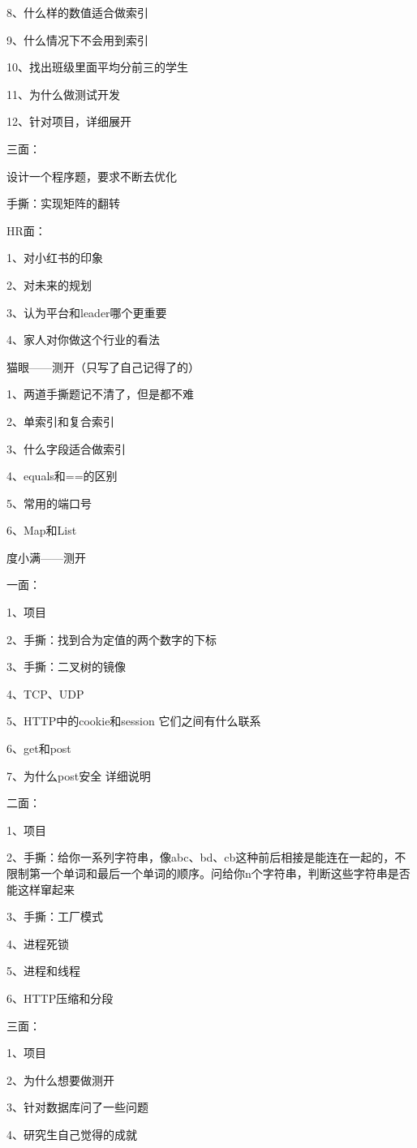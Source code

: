 \documentclass[UTF8]{ctexart}
\begin{document}
8、什么样的数值适合做索引

9、什么情况下不会用到索引

10、找出班级里面平均分前三的学生

11、为什么做测试开发

12、针对项目，详细展开

三面：

设计一个程序题，要求不断去优化

手撕：实现矩阵的翻转

HR面：

1、对小红书的印象

2、对未来的规划

3、认为平台和leader哪个更重要

4、家人对你做这个行业的看法

猫眼——测开（只写了自己记得了的）

1、两道手撕题记不清了，但是都不难

2、单索引和复合索引

3、什么字段适合做索引

4、equals和==的区别

5、常用的端口号

6、Map和List

度小满——测开

一面：

1、项目

2、手撕：找到合为定值的两个数字的下标

3、手撕：二叉树的镜像

4、TCP、UDP

5、HTTP中的cookie和session 它们之间有什么联系

6、get和post

7、为什么post安全 详细说明

二面：

1、项目

2、手撕：给你一系列字符串，像abc、bd、cb这种前后相接是能连在一起的，不限制第一个单词和最后一个单词的顺序。问给你n个字符串，判断这些字符串是否能这样窜起来

3、手撕：工厂模式

4、进程死锁

5、进程和线程

6、HTTP压缩和分段

三面：

1、项目

2、为什么想要做测开

3、针对数据库问了一些问题

4、研究生自己觉得的成就
\end{document}
